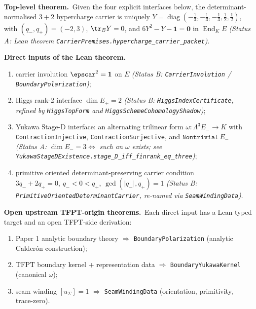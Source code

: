 \begin{tfptclaimcontract}
\textbf{Top-level theorem.}\ Given the four explicit interfaces below, the determinant-normalised
$3+2$ hypercharge carrier is uniquely
$Y = \operatorname{diag}(-\tfrac13,-\tfrac13,-\tfrac13,\tfrac12,\tfrac12)$, with $(q_-,q_+)=(-2,3)$,
$\tr_E Y = 0$, and $6 Y^2 - Y - \mathbf 1 = \mathbf 0$ in $\operatorname{End}_K E$
\emph{(Status A: Lean theorem
\texttt{CarrierPremises.hypercharge\_carrier\_packet})}.

\smallskip
\textbf{Direct inputs of the Lean theorem.}
\begin{enumerate}[leftmargin=1.7em, itemsep=0pt, label=(\arabic*)]
    \item carrier involution $\epscar^2 = \mathbf 1$ on $E$
        \emph{(Status B: \texttt{CarrierInvolution} / \texttt{BoundaryPolarization})};
    \item Higgs rank-$2$ interface $\dim E_+ = 2$
        \emph{(Status B: \texttt{HiggsIndexCertificate}, refined by
        \texttt{HiggsTopForm} and \texttt{HiggsSchemeCohomologyShadow})};
    \item Yukawa Stage-D interface: an alternating trilinear form
        $\omega : \Lambda^3 E_- \to K$ with
        \texttt{ContractionInjective}, \texttt{ContractionSurjective},
        and $\texttt{Nontrivial}\,E_-$
        \emph{(Status A: $\dim E_- = 3 \iff$ such an $\omega$ exists; see
        \texttt{YukawaStageDExistence.stage\_D\_iff\_finrank\_eq\_three})};
    \item primitive oriented determinant-preserving carrier condition
        $3 q_- + 2 q_+ = 0,\ q_- < 0 < q_+,\ \gcd(|q_-|, q_+) = 1$
        \emph{(Status B: \texttt{PrimitiveOrientedDeterminantCarrier},
        re-named via \texttt{SeamWindingData})}.
\end{enumerate}

\smallskip
\textbf{Open upstream TFPT-origin theorems.}\ Each direct input has a Lean-typed target and an
open TFPT-side derivation:
\begin{enumerate}[leftmargin=1.7em, itemsep=0pt, label=(\roman*)]
    \item Paper 1 analytic boundary theory $\Rightarrow$ \texttt{BoundaryPolarization}
        (analytic Calder\'on construction);
    \item TFPT boundary kernel + representation data $\Rightarrow$
        \texttt{BoundaryYukawaKernel} (canonical $\omega$);
    \item seam winding $[u_\Sigma] = 1$ $\Rightarrow$ \texttt{SeamWindingData}
        (orientation, primitivity, trace-zero).
\end{enumerate}


\end{tfptclaimcontract}

